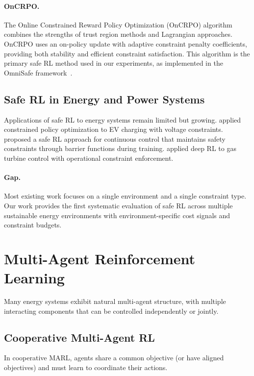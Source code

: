 \paragraph{OnCRPO.} The Online Constrained Reward Policy Optimization (OnCRPO) algorithm combines the strengths of trust region methods and Lagrangian approaches. OnCRPO uses an on-policy update with adaptive constraint penalty coefficients, providing both stability and efficient constraint satisfaction. This algorithm is the primary safe RL method used in our experiments, as implemented in the OmniSafe framework~\citep{ji2023omnisafe}.

\subsection{Safe RL in Energy and Power Systems}

Applications of safe RL to energy systems remain limited but growing. \citet{zhang2020ev_cpo} applied constrained policy optimization to EV charging with voltage constraints. \citet{cheng2019safe_hvac} proposed a safe RL approach for continuous control that maintains safety constraints through barrier functions during training. \citet{vu2021gas_turbine} applied deep RL to gas turbine control with operational constraint enforcement.

\paragraph{Gap.} Most existing work focuses on a single environment and a single constraint type. Our work provides the first systematic evaluation of safe RL across multiple sustainable energy environments with environment-specific cost signals and constraint budgets.

\section{Multi-Agent Reinforcement Learning}
\label{sec:lit_marl}

Many energy systems exhibit natural multi-agent structure, with multiple interacting components that can be controlled independently or jointly.

\subsection{Cooperative Multi-Agent RL}

In cooperative MARL, agents share a common objective (or have aligned objectives) and must learn to coordinate their actions.

